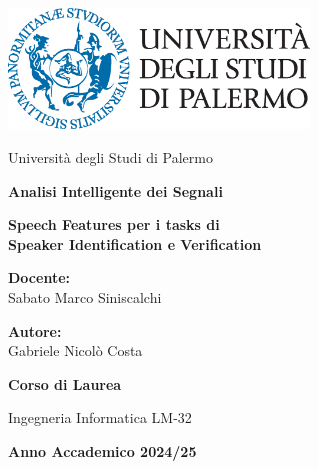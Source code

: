 \documentclass[12pt]{report}
\begin{document}


\begin{titlepage}
    \centering
    
    \includegraphics[width=0.6\textwidth]{logounipa.png} 
    
    \vspace{1cm}
    
    {\large Università degli Studi di Palermo \par}
    
    \vspace{1cm}
    
    {\Large \bfseries Analisi Intelligente dei Segnali \par}
    
    \vspace{1.5cm}
    
    {\Huge \textbf{Speech Features per i tasks di \\ Speaker Identification e Verification} \par}
    \vspace{2cm}
    
    \noindent
    \begin{minipage}{0.45\textwidth}
        \raggedright
        {\large \bfseries Docente:} \\
        {\large Sabato Marco Siniscalchi}
    \end{minipage}
    \hfill
    \begin{minipage}{0.45\textwidth}
        \raggedleft
        {\large \bfseries Autore:} \\
        {\large Gabriele Nicolò Costa}
    \end{minipage}


    
    \vspace{2cm}
    
    {\Large \bfseries Corso di Laurea \par}
    {\large Ingegneria Informatica LM-32 \par}

    \vspace{2cm}

    {\Large \bfseries Anno Accademico 2024/25 \par}
    
\end{titlepage}

\tableofcontents

\newpage

\newpage

\newpage 

\newpage 


\printbibliography
\end{document}
